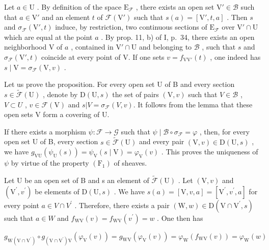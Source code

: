 Let \(a \in \mathrm{U}\) . By definition of the space \(\mathrm{E}_{\mathcal{F}}\) , there exists an open set \(\mathrm{V}' \in \mathcal{B}\) such that \(a \in \mathrm{V}'\) and an element \(t\) of \(\mathcal{F}(\mathrm{V}')\) such that \(s(a) = [\mathrm{V}', t, a]\) . Then \(s\) and \(\sigma_{\mathcal{F}}(\mathrm{V}', t)\) induce, by restriction, two continuous sections of \(\mathrm{E}_{\mathcal{F}}\) over \(\mathrm{V}' \cap \mathrm{U}\) which are equal at the point \(a\) . By prop. 11, b) of I, p.~34, there exists an open neighborhood V of \(a\) , contained in \(\mathrm{V}' \cap \mathrm{U}\) and belonging to \(\mathcal{B}\) , such that \(s\) and \(\sigma_{\mathcal{F}}(\mathrm{V}', t)\) coincide at every point of V. If one sets \(v = f_{\mathrm{VV}'}(t)\) , one indeed has \(s \mid \mathrm{V} = \sigma_{\mathcal{F}}(\mathrm{V}, v)\) .

Let us prove the proposition. For every open set U of B and every section \(s \in \widetilde{\mathcal{F}}(\mathrm{U})\) , denote by \(\mathrm{D}(\mathrm{U}, s)\) the set of pairs \((\mathrm{V}, v)\) such that \(V \in \mathcal{B}\) , \(V \subset U\) , \(v \in \mathcal{F}(\mathrm{V})\) and \(s | V = \sigma_{\mathcal{F}}(V, v)\). It follows from the lemma that these open sets V form a covering of U.

If there exists a morphism \(\psi\colon\mathcal{F}\to\mathcal{G}\) such that \(\psi\mid\mathcal{B}\circ\sigma_{\mathcal{F}}=\varphi\) , then, for every open set U of B, every section \(s\in\widetilde{\mathcal{F}}(\mathrm{U})\) and every pair \((\mathrm{V},v)\in\mathrm{D}(\mathrm{U},s)\) , we have \(g_{\mathrm{VU}}(\psi_{\mathrm{U}}(s))=\psi_{\mathrm{V}}(s\mid\mathrm{V})=\varphi_{\mathrm{V}}(v)\) . This proves the uniqueness of \(\psi\) by virtue of the property \((\mathrm{F}_{1})\) of sheaves.

Let U be an open set of B and s an element of \(\widetilde{\mathcal{F}}(\mathrm{U})\) . Let \((\mathrm{V},v)\) and \((\mathrm{V}^{\prime},v^{\prime})\) be elements of \(\mathrm{D}(\mathrm{U},s)\) . We have \(s(a)=[\mathrm{V},v,a]=[\mathrm{V}^{\prime},v^{\prime},a]\) for every point \(a\in V\cap V^{\prime}\) . Therefore, there exists a pair \((\mathrm{W},w)\in\mathrm{D}(\mathrm{V}\cap\mathrm{V}^{\prime},s)\) such that \(a\in W\) and \(f_{\mathrm{WV}}(v)=f_{\mathrm{WV}}(v^{\prime})=w\) . One then has

\[
g _ {\mathrm{W} (\mathrm{V} \cap \mathrm{V} ^ {\prime})} \circ g _ {(\mathrm{V} \cap \mathrm{V} ^ {\prime}) \mathrm{V}} (\varphi_ {\mathrm{V}} (v)) = g _ {\mathrm{WV}} (\varphi_ {\mathrm{V}} (v)) = \varphi_ {\mathrm{W}} (f _ {\mathrm{WV}} (v)) = \varphi_ {\mathrm{W}} (w)
\]

